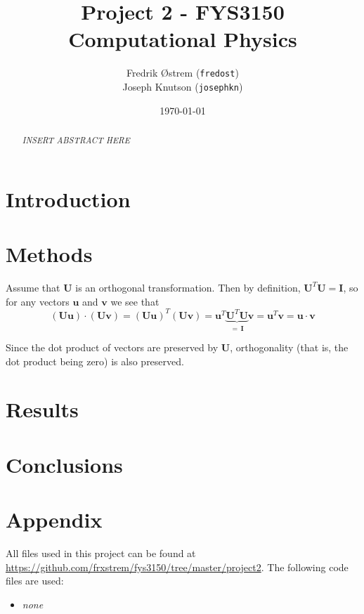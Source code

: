 \documentclass[12pt,a4paper]{article}
\newcommand\V[1]{\mathbf{#1}}                  %
\begin{document}
\title{Project 2 - FYS3150 Computational Physics}
\author{Fredrik Østrem (\texttt{fredost}) \\ Joseph Knutson (\texttt{josephkn})}
\date{\today}

\maketitle

\begin{abstract}
  \color{red}\textit{INSERT ABSTRACT HERE}
\end{abstract}

\tableofcontents

\clearpage

\section{Introduction}

\section{Methods}


Assume that $\V{U}$ is an orthogonal transformation. Then by definition, $\V{U}^T \V{U} = \V{I}$,
so for any vectors $\V{u}$ and $\V{v}$ we see that
\begin{equation}
  \left( \V{U} \V{u} \right) \cdot \left( \V{U} \V{v} \right)
    = \left( \V{U} \V{u} \right)^T \left( \V{U} \V{v} \right)
    = \V{u}^T \underbrace{\V{U}^T \V{U}}_{= \, \V{I}} \V{v}
    = \V{u}^T \V{v} = \V{u} \cdot \V{v}
\end{equation}

Since the dot product of vectors are preserved by $\V{U}$, orthogonality (that is, the dot product
being zero) is also preserved.

\section{Results}

\section{Conclusions}

\clearpage
\appendix
\section{Appendix}

All files used in this project can be found at \url{https://github.com/frxstrem/fys3150/tree/master/project2}.
The following code files are used:
\begin{itemize}
  \item {\it \color{red} none}
\end{itemize}

\clearpage

\printbibliography[heading=bibnumbered,title=Bibliography]
\end{document}
